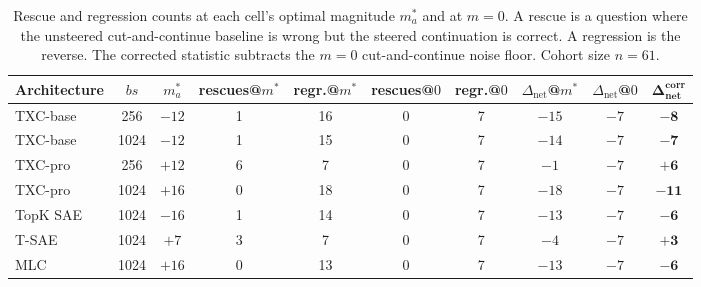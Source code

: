 \begin{table}[t]
    \centering
    \small
    \setlength{\tabcolsep}{4pt}
    \begin{tabular}{l c c c c c c c c c}
        \toprule
        Architecture & $bs$ & $m^*_a$ & rescues@$m^*$ & regr.@$m^*$ & rescues@$0$ & regr.@$0$ & $\Delta_{\text{net}}$@$m^*$ & $\Delta_{\text{net}}$@$0$ & $\boldsymbol{\Delta_{\text{net}}^{\text{corr}}}$ \\
        \midrule
        TXC-base & 256 & $-12$ & 1 & 16 & 0 & 7 & $-15$ & $-7$ & $\mathbf{-8}$ \\
        TXC-base & 1024 & $-12$ & 1 & 15 & 0 & 7 & $-14$ & $-7$ & $\mathbf{-7}$ \\
        TXC-pro & 256 & $+12$ & 6 & 7 & 0 & 7 & $-1$ & $-7$ & $\mathbf{+6}$ \\
        TXC-pro & 1024 & $+16$ & 0 & 18 & 0 & 7 & $-18$ & $-7$ & $\mathbf{-11}$ \\
        TopK SAE & 1024 & $-16$ & 1 & 14 & 0 & 7 & $-13$ & $-7$ & $\mathbf{-6}$ \\
        T-SAE & 1024 & $+7$ & 3 & 7 & 0 & 7 & $-4$ & $-7$ & $\mathbf{+3}$ \\
        MLC & 1024 & $+16$ & 0 & 13 & 0 & 7 & $-13$ & $-7$ & $\mathbf{-6}$ \\
        \bottomrule
    \end{tabular}
    \vspace{3em}
    \caption{Rescue and regression counts at each cell's optimal magnitude $m^*_a$ and at $m=0$. A rescue is a question where the unsteered cut-and-continue baseline is wrong but the steered continuation is correct. A regression is the reverse. The corrected statistic subtracts the $m=0$ cut-and-continue noise floor. Cohort size $n=61$.}
    \label{tab:c7-net-saves}
\end{table}

